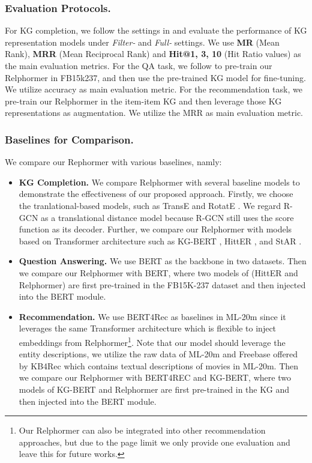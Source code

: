 \documentclass[sigconf]{acmart}
\begin{document}
\subsubsection{\textbf{Evaluation Protocols}.}
For KG completion, we follow the settings in \cite{HittER} and evaluate the performance of KG representation models under \textit{Filter-} and \textit{Full-} settings. 
We use \textbf{MR} (Mean Rank), \textbf{MRR} (Mean Reciprocal Rank) and \textbf{Hit@1, 3, 10} (Hit Ratio values) as the main evaluation metrics. 
For the QA task, we follow \cite{HittER} to pre-train our Relphormer in FB15k237, and then use the pre-trained KG model for fine-tuning.
We utilize accuracy as main evaluation metric.
For the recommendation task, we pre-train our Relphormer in the item-item KG and then leverage those KG representations as augmentation.
We utilize the MRR as main evaluation metric.




\subsubsection{\textbf{Baselines for Comparison.}}
We compare our Rephormer with various baselines, namly:
\begin{itemize}

   \item  \textbf{KG Completion.}
We compare Relphormer with several baseline models to demonstrate the effectiveness of our proposed approach.
Firstly, we choose the tranlational-based models, such as TransE \cite{TransE} and RotatE  \cite{RotatE}.
We regard R-GCN \cite{RGCN} as a translational distance model because  R-GCN still uses the score function as its decoder.
Further, we compare our Relphormer with models based on Transformer architecture such as KG-BERT \cite{KG-BERT}, HittER \cite{HittER}, and StAR \cite{StAR}.

   \item  \textbf{Question Answering.}
We use BERT as the backbone in two datasets.
Then we compare our Relphormer with BERT, where two models of (HittER \cite{HittER} and Relphormer) are first pre-trained in the FB15K-237 dataset and then injected into the BERT module.


   \item  \textbf{Recommendation.}
We use BERT4Rec \cite{BERT4Rec}  as baselines  in ML-20m since it leverages the same Transformer architecture which is flexible to inject embeddings from Relphormer\footnote{Our Relphormer can also be integrated into other recommendation approaches, but due to the page limit we only provide one evaluation and leave this for future works.}.
Note that our model should leverage the entity descriptions, we utilize the raw data of ML-20m and Freebase offered by KB4Rec \cite{Zhao-DI-2019} which contains textual descriptions of movies in ML-20m. 
Then we compare our Relphormer with BERT4REC and KG-BERT, where two models of KG-BERT and Relphormer are first pre-trained in the KG and then injected into the BERT module.

\end{itemize}
\end{document}
